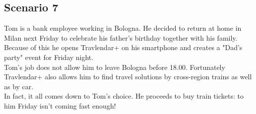 \subsection{Scenario 7}

Tom is a bank employee working in Bologna. He decided to return at home in Milan next Friday to celebrate his father's birthday together with his family.\\
Because of this he opens Travlendar+ on his smartphone and creates a "Dad's party" event for Friday night.\\
Tom’s job does not allow him to leave Bologna before 18.00. Fortunately Travlendar+ also allows him to find travel solutions by cross-region trains as well as by car.\\
In fact, it all comes down to Tom's choice. He proceeds to buy train tickets: to him Friday isn’t coming fast enough!




